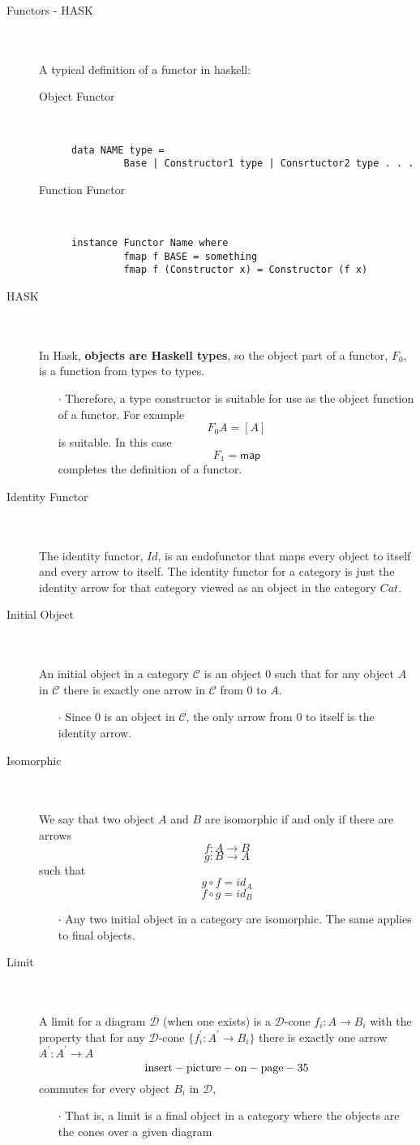\documentclass[10pt]{article}
\newcommand{\imp}{\textbf}
\newcommand{\state}[1]{\item[#1] \textcolor{white}{.} \\ \textcolor{white}{.} \\ }
\newcommand{\nl}{\textcolor{white}{.}\ }
\newcommand{\func}[3]{#1 : #2 \rightarrow #3}
\newcommand{\CC}{\mathcal{C}}
\newcommand{\DD}{\mathcal{D}}
\newcommand{\point}[1]{\begin{itemize} \item[$\cdot$] #1 \end{itemize}}
\begin{document}
\begin{description}
\state{Functors - HASK}
A typical definition of a functor in haskell:
\begin{description}
\item[Object Functor] \nl
\begin{verbatim}
data NAME type =
         Base | Constructor1 type | Consrtuctor2 type . . .
\end{verbatim}
\item[Function Functor] \nl
\begin{verbatim}
instance Functor Name where
         fmap f BASE = something
         fmap f (Constructor x) = Constructor (f x)
\end{verbatim}
\end{description}


\state{HASK}
In Hask, \imp{objects are Haskell types}, so the object part of a functor, $F_0$, is a function from types to types.

\point{Therefore, a type constructor is suitable for use as the object function of a functor. 
For example $$ F_0 A = [A] $$ is suitable. In this case $$F_1 = \textsf{map}$$
completes the definition of a functor.}

\state{Identity Functor}
The identity functor, $Id$, is an endofunctor that maps every object to itself and every arrow to itself. The identity functor for a category is just the identity arrow for that category viewed as an object in the category $Cat$.

\state{Initial Object}
An initial object in a category $\CC$ is an object $0$ such that for any object $A$ in $\CC$ there is exactly one arrow in $\CC$ from $0$ to $A$.

\point{Since 0 is an object in $\CC$, the only arrow from $0$ to itself is the identity arrow.}

\state{Isomorphic}
We say that two object $A$ and $B$ are isomorphic if and only if there are arrows
$$\func{f}{A}{B}$$ $$\func{g}{B}{A}$$ such that $$g \circ f = id_A$$ $$f \circ g = id_B$$

\point{Any two initial object in a category are isomorphic. The same applies to final objects.}

\state{Limit}
A limit for a diagram $\DD$ (when one exists) is a $\DD$-cone ${\func{f_i}{A}{B_i}}$ with the property that for any $\DD$-cone $\{\func{f^\prime_i}{A^\prime}{B_i}\}$ there is exactly one arrow $\func{A^\prime}{A^\prime}{A}$
$$ \rm{insert-picture-on-page-35} $$
commutes for every object $B_i$ in $\DD$,
\point{That is, a limit is a final object in a category where the objects are the cones over a given diagram}


\end{description}
\end{document}
